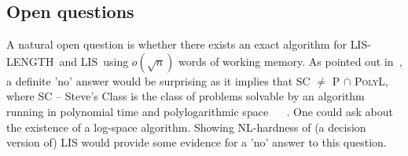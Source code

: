 \documentclass[lic, english, shortabstract]{iithesis}
\theoremstyle{plain}
\newcommand{\Lis}{\textsc{LIS}}
\newcommand{\LisLen}{\textsc{LIS-LENGTH}}
\theoremstyle{definition}
\begin{document}
\subsection{Open questions}
A natural open question is whether there exists an exact algorithm for \LisLen\ and \Lis\ using $o(\sqrt{n})$ words of working memory.
As pointed out in~\cite{kiyomi2017space}, a definite 'no' answer would be surprising as it implies that \textsc{SC} $\neq$ \textsc{P} $\cap$ \textsc{PolyL},
where \textsc{SC} -- Steve's Class is the class of problems solvable by an algorithm running in polynomial time and polylogarithmic space ~\cite{sc-cfl} ~\cite{rl-sc}.
One could ask about the existence of a log-space algorithm. Showing NL-hardness of (a decision version of) LIS would provide some evidence for a 'no' answer to this question.





\printbibliography
\end{document}
